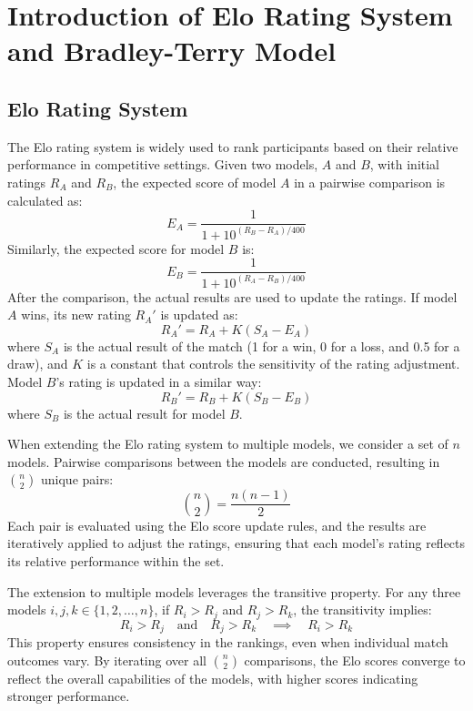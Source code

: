 \section{Introduction of Elo Rating System and Bradley-Terry Model}
\subsection{Elo Rating System}
\label{app:elo}
The Elo rating system \citep{elo} is widely used to rank participants based on their relative performance in competitive settings. Given two models, $A$ and $B$, with initial ratings $R_A$ and $R_B$, the expected score of model $A$ in a pairwise comparison is calculated as:
\[
E_A = \frac{1}{1 + 10^{(R_B - R_A)/400}}
\]
Similarly, the expected score for model $B$ is:
\[
E_B = \frac{1}{1 + 10^{(R_A - R_B)/400}}
\]
After the comparison, the actual results are used to update the ratings. If model $A$ wins, its new rating $R_A'$ is updated as:
\[
R_A' = R_A + K(S_A - E_A)
\]
where $S_A$ is the actual result of the match (1 for a win, 0 for a loss, and 0.5 for a draw), and $K$ is a constant that controls the sensitivity of the rating adjustment. Model $B$'s rating is updated in a similar way:
\[
R_B' = R_B + K(S_B - E_B)
\]
where $S_B$ is the actual result for model $B$.

When extending the Elo rating system to multiple models, we consider a set of $n$ models. Pairwise comparisons between the models are conducted, resulting in $\binom{n}{2}$ unique pairs:
\[
\binom{n}{2} = \frac{n(n-1)}{2}
\]
Each pair is evaluated using the Elo score update rules, and the results are iteratively applied to adjust the ratings, ensuring that each model’s rating reflects its relative performance within the set.

The extension to multiple models leverages the transitive property. For any three models $i, j, k \in \{1, 2, \dots, n\}$, if $R_i > R_j$ and $R_j > R_k$, the transitivity implies:
\[
R_i > R_j \quad \text{and} \quad R_j > R_k \quad \implies \quad R_i > R_k
\]
This property ensures consistency in the rankings, even when individual match outcomes vary. By iterating over all $\binom{n}{2}$ comparisons, the Elo scores converge to reflect the overall capabilities of the models, with higher scores indicating stronger performance.




